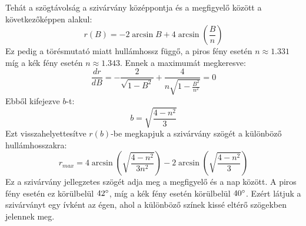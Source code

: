 \documentclass[../main.tex]{subfiles}
\begin{document}
Tehát a szögtávolság a szivárvány középpontja és a megfigyelő között a következőképpen alakul:
\begin{equation}
    r(B) = -2 \arcsin B + 4 \arcsin \left(\frac{B}{n}\right)
\end{equation}
Ez pedig a törésmutató miatt hullámhossz függő, a piros fény esetén $n \approx 1.331$ míg a kék fény esetén $n \approx 1.343$. 
Ennek a maximumát megkeresve:
\begin{equation}
    \frac{dr}{dB} = -\frac{2}{\sqrt{1 - B^2}} + \frac{4}{n \sqrt{1 - \frac{B^2}{n^2}}} = 0
\end{equation}
Ebből kifejezve $b$-t:
\begin{equation}
    b = \sqrt{\frac{4 - n^2}{3}}
\end{equation}
Ezt visszahelyettesítve $r(b)$-be megkapjuk a szivárvány szögét a különböző hullámhosszakra:
\begin{equation}
    r_{max} = 4 \arcsin \left(\sqrt{\frac{4 - n^2}{3 n^2}}\right) - 2 \arcsin \left(\sqrt{\frac{4 - n^2}{3}}\right)
\end{equation}
Ez a szivárvány jellegzetes szögét adja meg a megfigyelő és a nap között. A piros fény esetén ez körülbelül $42\degree$, míg a kék fény esetén körülbelül $40\degree$. Ezért látjuk a szivárványt egy ívként az égen, ahol a különböző színek kissé eltérő szögekben jelennek meg.
\end{document}

